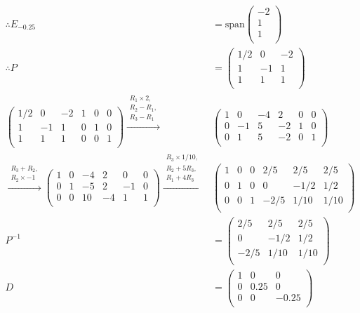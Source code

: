 \documentclass[12pt]{article}
\begin{document}
\begin{align*}
\therefore E_{-0.25} &= \text{span}
\left( \begin{array}{c} 
-2\\
1\\
1\\
\end{array} \right)\\
\therefore P &= 
\left( \begin{array}{ccc} 
1/2 & 0 & -2\\
1 & -1 & 1\\
1 & 1 & 1\\
\end{array} \right)\\
\left( \begin{array}{ccc|ccc} 
1/2 & 0 & -2 & 1 & 0 & 0\\
1 & -1 & 1 & 0 & 1 & 0\\
1 & 1 & 1 & 0 & 0 & 1\\
\end{array} \right)
\xrightarrow{\substack{R_1 \times 2,\\R_2 - R_1,\\R_3 - R_1}}
&
\left( \begin{array}{ccc|ccc} 
1 & 0 & -4 & 2 & 0 & 0\\
0 & -1 & 5 & -2 & 1 & 0\\
0 & 1 & 5 & -2 & 0 & 1\\
\end{array} \right)\\
\xrightarrow{\substack{R_3 + R_2,\\R_2 \times -1}}
\left( \begin{array}{ccc|ccc} 
1 & 0 & -4 & 2 & 0 & 0\\
0 & 1 & -5 & 2 & -1 & 0\\
0 & 0 & 10 & -4 & 1 & 1\\
\end{array} \right)
\xrightarrow{\substack{R_3 \times 1/10,\\R_2 + 5R_3,\\R_1 + 4R_3}}
&
\left( \begin{array}{ccc|ccc} 
1 & 0 & 0 & 2/5 & 2/5 & 2/5\\
0 & 1 & 0 & 0 & -1/2 & 1/2\\
0 & 0 & 1 & -2/5 & 1/10 & 1/10\\
\end{array} \right)\\
P^{-1} &= 
\left( \begin{array}{ccc} 
2/5 & 2/5 & 2/5\\
0 & -1/2 & 1/2\\
-2/5 & 1/10 & 1/10\\
\end{array} \right)\\
D &= 
\left( \begin{array}{ccc} 
1 & 0 & 0\\
0 & 0.25 & 0\\
0 & 0 & -0.25\\
\end{array} \right)\\
\end{align*}
\end{document}
